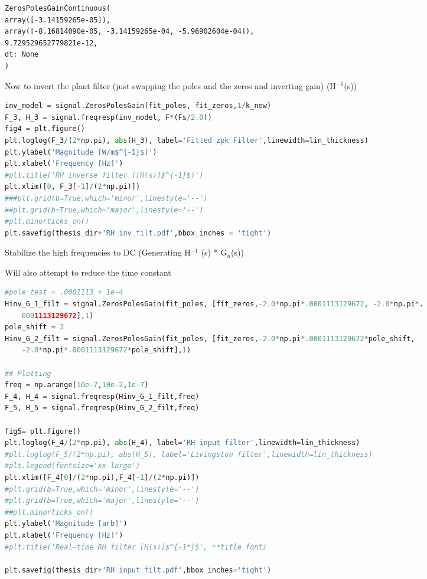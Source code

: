 \begin{spacing}{1.2} \begin{lstlisting}[frame=single]
ZerosPolesGainContinuous(
array([-3.14159265e-05]),
array([-8.16814090e-05, -3.14159265e-04, -5.96902604e-04]),
9.729529652779821e-12,
dt: None
)
\end{lstlisting} \end{spacing}

\noindent Now to invert the plant filter (just swapping the poles and the zeros and inverting gain)
(H\(^{-1}\)(s))

\begin{spacing}{1.2} \begin{lstlisting}[frame=single,language=Python]
inv_model = signal.ZerosPolesGain(fit_poles, fit_zeros,1/k_new)
F_3, H_3 = signal.freqresp(inv_model, F*(Fs/2.0))
fig4 = plt.figure()
plt.loglog(F_3/(2*np.pi), abs(H_3), label='Fitted zpk Filter',linewidth=lin_thickness)
plt.ylabel('Magnitude [W/m$^{-1}$]')
plt.xlabel('Frequency [Hz]')
#plt.title('RH inverse filter ([H(s)]$^{-1}$)')
plt.xlim([0, F_3[-1]/(2*np.pi)])
###plt.grid(b=True,which='minor',linestyle='--')
##plt.grid(b=True,which='major',linestyle='--')
#plt.minorticks_on()
plt.savefig(thesis_dir+'RH_inv_filt.pdf',bbox_inches = 'tight')
\end{lstlisting} \end{spacing}


\noindent Stabilize the high frequencies to DC (Generating H\(^{-1}\) (s) * G\(_{n}\)(s))

\noindent Will also attempt to reduce the time constant

\begin{spacing}{1.2} \begin{lstlisting}[frame=single,language=Python]
#pole_test = .0001113 + 1e-4
Hinv_G_1_filt = signal.ZerosPolesGain(fit_poles, [fit_zeros,-2.0*np.pi*.0001113129672, -2.0*np.pi*.
    0001113129672],1)
pole_shift = 3
Hinv_G_2_filt = signal.ZerosPolesGain(fit_poles, [fit_zeros,-2.0*np.pi*.0001113129672*pole_shift, 
    -2.0*np.pi*.0001113129672*pole_shift],1)

## Plotting
freq = np.arange(10e-7,10e-2,1e-7)
F_4, H_4 = signal.freqresp(Hinv_G_1_filt,freq)
F_5, H_5 = signal.freqresp(Hinv_G_2_filt,freq)

fig5= plt.figure()
plt.loglog(F_4/(2*np.pi), abs(H_4), label='RH input filter',linewidth=lin_thickness)
#plt.loglog(F_5/(2*np.pi), abs(H_5), label='Livingston filter',linewidth=lin_thickness)
#plt.legend(fontsize='xx-large')
plt.xlim([F_4[0]/(2*np.pi),F_4[-1]/(2*np.pi)])
#plt.grid(b=True,which='minor',linestyle='--')
#plt.grid(b=True,which='major',linestyle='--')
##plt.minorticks_on()
plt.ylabel('Magnitude [arb]')
plt.xlabel('Frequency [Hz]')
#plt.title('Real-time RH filter [H(s)]$^{-1*}$', **title_font)

plt.savefig(thesis_dir+'RH_input_filt.pdf',bbox_inches='tight')
\end{lstlisting} \end{spacing}

